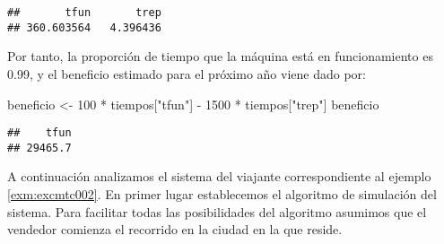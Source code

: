 \documentclass[
]{book}
\newenvironment{Shaded}{\begin{snugshade}}{\end{snugshade}}
\newcommand{\DecValTok}[1]{\textcolor[rgb]{0.00,0.00,0.81}{#1}}
\newcommand{\NormalTok}[1]{#1}
\newcommand{\OtherTok}[1]{\textcolor[rgb]{0.56,0.35,0.01}{#1}}
\newcommand{\SpecialCharTok}[1]{\textcolor[rgb]{0.00,0.00,0.00}{#1}}
\newcommand{\StringTok}[1]{\textcolor[rgb]{0.31,0.60,0.02}{#1}}
\theoremstyle{definition}
\theoremstyle{definition}
\theoremstyle{definition}
\theoremstyle{definition}
\theoremstyle{remark}
\begin{document}
\begin{verbatim}
##       tfun       trep 
## 360.603564   4.396436
\end{verbatim}

Por tanto, la proporción de tiempo que la máquina está en funcionamiento es 0.99, y el beneficio estimado para el próximo año viene dado por:

\begin{Shaded}
\begin{Highlighting}[]
\NormalTok{beneficio }\OtherTok{\textless{}{-}} \DecValTok{100} \SpecialCharTok{*}\NormalTok{ tiempos[}\StringTok{"tfun"}\NormalTok{] }\SpecialCharTok{{-}} \DecValTok{1500} \SpecialCharTok{*}\NormalTok{ tiempos[}\StringTok{"trep"}\NormalTok{]}
\NormalTok{beneficio}
\end{Highlighting}
\end{Shaded}

\begin{verbatim}
##    tfun 
## 29465.7
\end{verbatim}

A continuación analizamos el sistema del viajante correspondiente al ejemplo \ref{exm:excmtc002}. En primer lugar establecemos el algoritmo de simulación del sistema. Para facilitar todas las posibilidades del algoritmo asumimos que el vendedor comienza el recorrido en la ciudad en la que reside.
\end{document}
